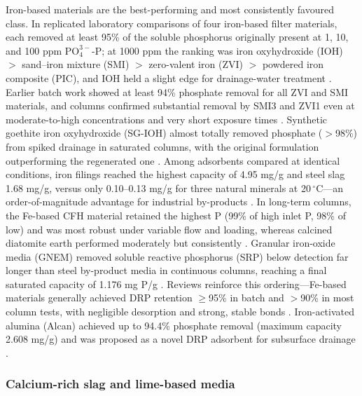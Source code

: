 Iron-based materials are the best-performing and most consistently favoured class. In replicated laboratory comparisons of four iron-based filter materials, each removed at least 95\% of the soluble phosphorus originally present at 1, 10, and 100 ppm $\mathrm{PO_4^{3-}}$-P; at 1000 ppm the ranking was iron oxyhydroxide (IOH) $>$ sand--iron mixture (SMI) $>$ zero-valent iron (ZVI) $>$ powdered iron composite (PIC), and IOH held a slight edge for drainage-water treatment \parencite{Allred2014}. Earlier batch work showed at least 94\% phosphate removal for all ZVI and SMI materials, and columns confirmed substantial removal by SMI3 and ZVI1 even at moderate-to-high concentrations and very short exposure times \parencite{Allred2012}. Synthetic goethite iron oxyhydroxide (SG-IOH) almost totally removed phosphate ($>$98\%) from spiked drainage in saturated columns, with the original formulation outperforming the regenerated one \parencite{Allred2017}. Among adsorbents compared at identical conditions, iron filings reached the highest capacity of 4.95 mg/g and steel slag 1.68 mg/g, versus only 0.10--0.13 mg/g for three natural minerals at 20\,$^{\circ}$C---an order-of-magnitude advantage for industrial by-products \parencite{Sellner2019b}. In long-term columns, the Fe-based CFH material retained the highest P (99\% of high inlet P, 98\% of low) and was most robust under variable flow and loading, whereas calcined diatomite earth performed moderately but consistently \parencite{Pugliese2023}. Granular iron-oxide media (GNEM) removed soluble reactive phosphorus (SRP) below detection far longer than steel by-product media in continuous columns, reaching a final saturated capacity of 1.176 mg P/g \parencite{Hauda2020}. Reviews reinforce this ordering---Fe-based materials generally achieved DRP retention $\geq$95\% in batch and $>$90\% in most column tests, with negligible desorption and strong, stable bonds \parencite{Mendes2022}. Iron-activated alumina (Alcan) achieved up to 94.4\% phosphate removal (maximum capacity 2.608 mg/g) and was proposed as a novel DRP adsorbent for subsurface drainage \parencite{Kumari2025}.

\subsubsection{Calcium-rich slag and lime-based media}

